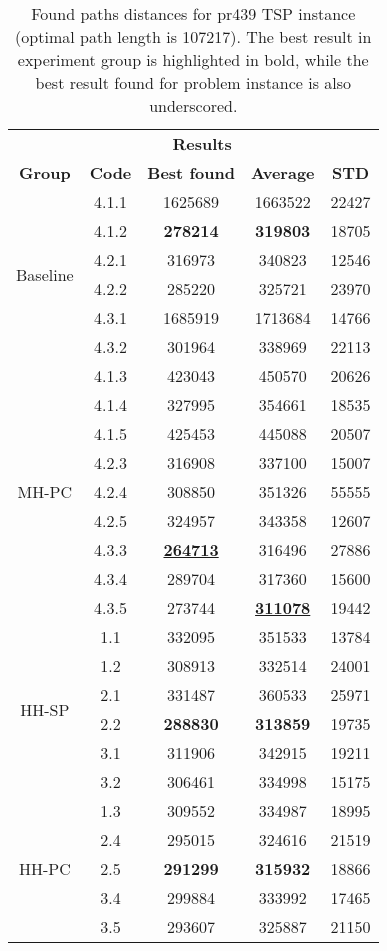 \begin{table}[!htbp]
	\begin{tabular}{ccccc}
		\hline
		\rowcolor{gray!20}
		\multicolumn{2}{c}{\textbf{Solver}} & \multicolumn{3}{c}{\textbf{Results}} \\
		\rowcolor{gray!20}
		\textbf{Group} & \textbf{Code} & \textbf{Best found} & \textbf{Average} & \textbf{STD}\\
		\hline
		\multirow{6}{*}{Baseline} 
		& 4.1.1 & 1625689 & 1663522 & 22427 \\
		& 4.1.2 & \textbf{278214} & \textbf{319803} & 18705 \\
		& 4.2.1 & 316973 & 340823 & 12546 \\
		& 4.2.2 & 285220 & 325721 & 23970 \\
		& 4.3.1 & 1685919 & 1713684 & 14766 \\
		& 4.3.2 & 301964 & 338969 & 22113 \\
		\hline
		\multirow{9}{*}{MH-PC} 
		& 4.1.3 & 423043 & 450570 & 20626 \\
		& 4.1.4 & 327995 & 354661 & 18535 \\
		& 4.1.5 & 425453 & 445088 & 20507 \\
		& 4.2.3 & 316908 & 337100 & 15007 \\
		& 4.2.4 & 308850 & 351326 & 55555 \\
		& 4.2.5 & 324957 & 343358 & 12607 \\
		& 4.3.3 & \textbf{\underline{264713}} & 316496 & 27886 \\
		& 4.3.4 & 289704 & 317360 & 15600 \\
		& 4.3.5 & 273744 & \textbf{\underline{311078}} & 19442 \\
		\hline
		\multirow{6}{*}{HH-SP} 
		& 1.1 & 332095 & 351533 & 13784 \\
		& 1.2 & 308913 & 332514 & 24001 \\
		& 2.1 & 331487 & 360533 & 25971 \\
		& 2.2 & \textbf{288830} & \textbf{313859} & 19735 \\
		& 3.1 & 311906 & 342915 & 19211 \\
		& 3.2 & 306461 & 334998 & 15175 \\
		\hline
		\multirow{5}{*}{HH-PC} 
		& 1.3 & 309552 & 334987 & 18995 \\
		& 2.4 & 295015 & 324616 & 21519 \\
		& 2.5 & \textbf{291299} & \textbf{315932} & 18866 \\
		& 3.4 & 299884 & 333992 & 17465 \\
		& 3.5 & 293607 & 325887 & 21150 \\
		\hline
	\end{tabular}
	\caption{Found paths distances for pr439 TSP instance (optimal path length is 107217). The best result in experiment group is highlighted in bold, while the best result found for problem instance is also underscored.}
\end{table}


